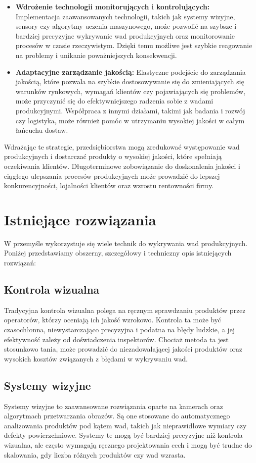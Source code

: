\begin{itemize}
\item \textbf{Wdrożenie technologii monitorujących i kontrolujących:} Implementacja zaawansowanych technologii, takich jak systemy wizyjne, sensory czy algorytmy uczenia maszynowego, może pozwolić na szybsze i bardziej precyzyjne wykrywanie wad produkcyjnych oraz monitorowanie procesów w czasie rzeczywistym. Dzięki temu możliwe jest szybkie reagowanie na problemy i unikanie poważniejszych konsekwencji.

\item \textbf{Adaptacyjne zarządzanie jakością:} Elastyczne podejście do zarządzania jakością, które pozwala na szybkie dostosowywanie się do zmieniających się warunków rynkowych, wymagań klientów czy pojawiających się problemów, może przyczynić się do efektywniejszego radzenia sobie z wadami produkcyjnymi. Współpraca z innymi działami, takimi jak badania i rozwój czy logistyka, może również pomóc w utrzymaniu wysokiej jakości w całym łańcuchu dostaw.

\end{itemize}

Wdrażając te strategie, przedsiębiorstwa mogą zredukować występowanie wad produkcyjnych i dostarczać produkty o wysokiej jakości, które spełniają oczekiwania klientów. Długoterminowe zobowiązanie do doskonalenia jakości i ciągłego ulepszania procesów produkcyjnych może prowadzić do lepszej konkurencyjności, lojalności klientów oraz wzrostu rentowności firmy.

\section{Istniejące rozwiązania}
W przemyśle wykorzystuje się wiele technik do wykrywania wad produkcyjnych. Poniżej przedstawiamy obszerny, szczegółowy i techniczny opis istniejących rozwiązań:

\subsection{Kontrola wizualna}
Tradycyjna kontrola wizualna polega na ręcznym sprawdzaniu produktów przez operatorów, którzy oceniają ich jakość wzrokowo. Kontrola ta może być czasochłonna, niewystarczająco precyzyjna i podatna na błędy ludzkie, a jej efektywność zależy od doświadczenia inspektorów. Chociaż metoda ta jest stosunkowo tania, może prowadzić do niezadowalającej jakości produktów oraz wysokich kosztów związanych z błędami w wykrywaniu wad.

\subsection{Systemy wizyjne}
Systemy wizyjne to zaawansowane rozwiązania oparte na kamerach oraz algorytmach przetwarzania obrazów. Są one stosowane do automatycznego analizowania produktów pod kątem wad, takich jak nieprawidłowe wymiary czy defekty powierzchniowe. Systemy te mogą być bardziej precyzyjne niż kontrola wizualna, ale często wymagają ręcznego projektowania cech i mogą być trudne do skalowania, gdy liczba różnych produktów czy wad wzrasta.

